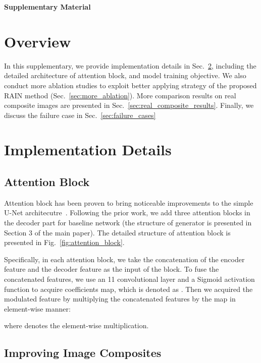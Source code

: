 \documentclass[final]{cvpr}
\begin{document}
{\small


}



\appendix

{\Large
\noindent
\newline
\textbf{Supplementary Material}}
\section{Overview}
\label{sec:overview}

In this supplementary, we provide implementation details in Sec.~\ref{sec:implementation}, including the detailed architecture of attention block, and model training objective. We also conduct more ablation studies to exploit better applying strategy of the proposed RAIN method (Sec.~\ref{sec:more_ablation}). More comparison results on real composite images are presented in Sec.~\ref{sec:real_composite_results}. Finally, we discuss the failure case in Sec.~\ref{sec:failure_cases}

\section{Implementation Details}
\label{sec:implementation}



\subsection{Attention Block}
\label{subsec:attention_block}
Attention block has been proven to  bring noticeable improvements to the simple U-Net architecutre~\cite{cong2020dovenet,cun2020improving}. Following the prior work, we add three attention blocks in the decoder part for baseline network (the structure of generator is presented in Section 3 of the main paper). The detailed structure of attention block is presented in Fig.~\ref{fig:attention_block}. 

Specifically, in each attention block, we take the concatenation of the encoder feature and the decoder feature  as the input of the block. To fuse the concatenated features, we use an 11 convolutional layer and a Sigmoid activation function  to acquire coefficients map, which is denoted as . Then we acquired the modulated feature  by multiplying the concatenated features by the map in element-wise manner:

where  denotes the element-wise multiplication.

\subsection{Improving Image Composites}
\label{subsec:improving_composite}
\end{document}
